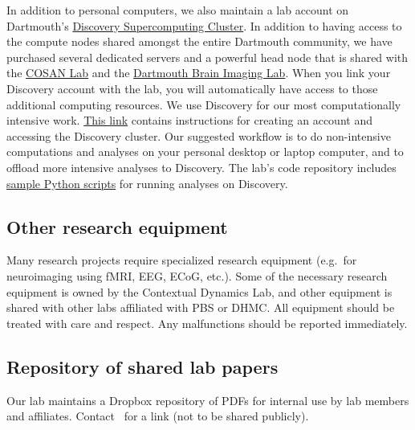 \documentclass{tufte-book} %
\begin{document}
In addition to personal computers, we also maintain a lab account on
Dartmouth's \href{http://techdoc.dartmouth.edu/discovery/}{Discovery
  Supercomputing Cluster}.  In addition to having access to the
compute nodes shared amongst the entire Dartmouth community, we have
purchased several dedicated servers and a powerful head node that is
shared with the \href{http://www.cosanlab.com/}{COSAN Lab} and the
\href{http://www.dartmouth.edu/~bil/}{Dartmouth Brain Imaging Lab}.
When you link your Discovery account with the lab, you will
automatically have access to those additional computing resources.  We
use Discovery for our most computationally intensive work.
\href{https://trello-attachments.s3.amazonaws.com/56f548a3cb4847c27668e504/56f7ff07085632013a40545a/44c1921381d6193eca67e9c875a32960/discovery_cluster_tutorial.pdf}{This
  link} contains instructions for creating an account and accessing 	%
the Discovery cluster.  Our suggested workflow is to do non-intensive
computations and analyses on your personal desktop or laptop computer,
and to offload more intensive analyses to Discovery.  The lab's code
repository includes
\href{https://github.com/ContextLab/cluster-tools-dartmouth}{sample
  Python scripts} for running analyses on Discovery.

 \subsection{Other research equipment}
 Many research projects require specialized research equipment (e.g.\
 for neuroimaging using fMRI, EEG, ECoG, etc.).  Some of the necessary
 research equipment is owned by the Contextual Dynamics Lab, and other
 equipment is shared with other labs affiliated with PBS or DHMC.  All
 equipment should be treated with care and respect.  Any malfunctions
 should be reported immediately.

\subsection{Repository of shared lab papers}
Our lab maintains a Dropbox repository of PDFs for internal use by lab members and affiliates. Contact \director~for a link (not to be shared publicly).
\end{document}
